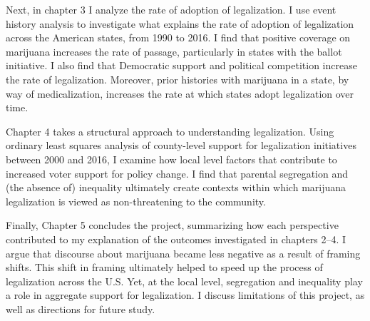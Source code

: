 Next, in chapter 3 I analyze the rate of adoption of legalization. I use event history analysis to investigate what explains the rate of adoption of legalization across the American states, from 1990 to 2016. I find that positive coverage on marijuana increases the rate of passage, particularly in states with the ballot initiative. I also find that Democratic support and political competition increase the rate of legalization. Moreover, prior histories with marijuana in a state, by way of medicalization, increases the rate at which states adopt legalization over time. 

Chapter 4 takes a structural approach to understanding legalization. Using ordinary least squares analysis of county-level support for legalization initiatives between 2000 and 2016, I examine how local level factors that contribute to increased voter support for policy change. I find that parental segregation and (the absence of) inequality ultimately create contexts within which marijuana legalization is viewed as non-threatening to the community. 

Finally, Chapter 5 concludes the project, summarizing how each perspective contributed to my explanation of the outcomes investigated in chapters 2--4. I argue that discourse about marijuana became less negative as a result of framing shifts. This shift in framing ultimately helped to speed up the process of legalization across the U.S. Yet, at the local level, segregation and inequality play a role in aggregate support for legalization. I discuss limitations of this project, as well as directions for future study.



